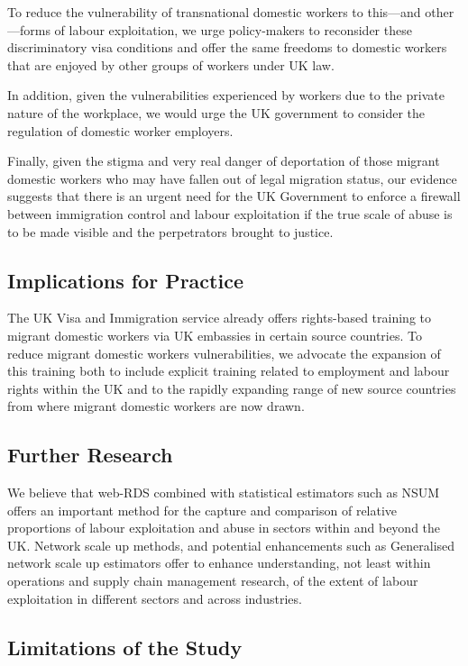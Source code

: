 \documentclass[
  12pt,
]{article}
\theoremstyle{plain}
\theoremstyle{definition}
\begin{document}
To reduce the vulnerability of transnational domestic workers to
this---and other---forms of labour exploitation, we urge policy-makers
to reconsider these discriminatory visa conditions and offer the same
freedoms to domestic workers that are enjoyed by other groups of workers
under UK law.

In addition, given the vulnerabilities experienced by workers due to the
private nature of the workplace, we would urge the UK government to
consider the regulation of domestic worker employers.

Finally, given the stigma and very real danger of deportation of those
migrant domestic workers who may have fallen out of legal migration
status, our evidence suggests that there is an urgent need for the UK
Government to enforce a firewall between immigration control and labour
exploitation if the true scale of abuse is to be made visible and the
perpetrators brought to justice.

\subsection{Implications for Practice}\label{implications-for-practice}

The UK Visa and Immigration service already offers rights-based training
to migrant domestic workers via UK embassies in certain source
countries. To reduce migrant domestic workers vulnerabilities, we
advocate the expansion of this training both to include explicit
training related to employment and labour rights within the UK and to
the rapidly expanding range of new source countries from where migrant
domestic workers are now drawn.

\subsection{Further Research}\label{further-research}

We believe that web-RDS combined with statistical estimators such as
NSUM offers an important method for the capture and comparison of
relative proportions of labour exploitation and abuse in sectors within
and beyond the UK. Network scale up methods, and potential enhancements
such as Generalised network scale up estimators offer to enhance
understanding, not least within operations and supply chain management
research, of the extent of labour exploitation in different sectors and
across industries.

\subsection{Limitations of the Study}\label{limitations-of-the-study}
\end{document}
